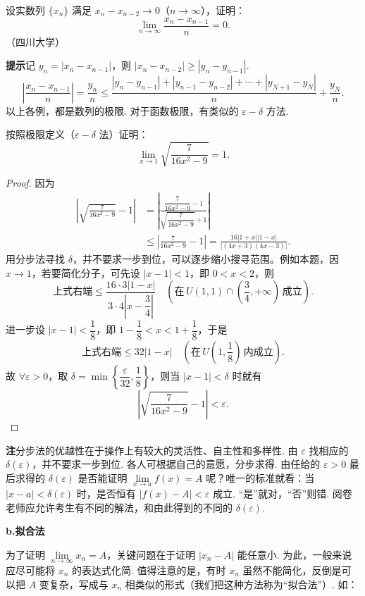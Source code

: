 \documentclass[UTF8,12pt,a4paper,fontset=fandol]{ctexart}
\begin{document}
设实数列 $\{x_n\}$ 满足 $x_n-x_{n-2}\to0$（$n\to\infty$），证明：
\[
  \lim_{n\to\infty}\frac{x_n-x_{n-1}}n=0.
\]
（四川大学）

\noindent\textbf{提示}\quad 记 $y_n=|x_n-x_{n-1}|$，则 $|x_n-x_{n-2}|\ge |y_n-y_{n-1}|$.
\[
  \left|\frac{x_n-x_{n-1}}n\right|
  =\frac{y_n}n
  \le \frac{|y_n-y_{n-1}|+|y_{n-1}-y_{n-2}|+\cdots+|y_{N+1}-y_N|}{n}
  +\frac{y_N}{n}.
\]
以上各例，都是数列的极限. 对于函数极限，有类似的 $\varepsilon-\delta$ 方法.


\begin{example}
按照极限定义（$\varepsilon-\delta$ 法）证明：
\[
  \lim_{x\to1}\sqrt{\frac7{16x^2-9}}=1.
\]

\begin{proof}
因为
\begin{align*}
\left|\sqrt{\frac7{16x^2-9}}-1\right|
&=\left|\frac{\dfrac7{16x^2-9}-1}{\sqrt{\dfrac7{16x^2-9}}+1}\right|\\
&\leqslant \left|\frac7{16x^2-9}-1\right|
=\frac{16|1+x||1-x|}{|(4x+3)(4x-3)|}.
\end{align*}
用分步法寻找 $\delta$，并不要求一步到位，可以逐步缩小搜寻范围。例如本题，因 $x\to1$，若要简化分子，可先设 $|x-1|<1$，即 $0<x<2$，则
\[
  \text{上式右端}\leqslant
  \frac{16\cdot3|1-x|}{3\cdot4\left|x-\dfrac34\right|}
  \quad\left(\text{在}\,U(1,1)\cap\left(\frac34,+\infty\right)\,\text{成立}\right).
\]
进一步设 $|x-1|<\dfrac18$，即 $1-\dfrac18<x<1+\dfrac18$，于是
\[
  \text{上式右端}\leqslant 32|1-x|\quad\left(\text{在}\,U\left(1,\frac18\right)\,\text{内成立}\right).
\]
故 $\forall\varepsilon>0$，取 $\delta=\min\left\{\dfrac\varepsilon{32},\dfrac18\right\}$，则当 $|x-1|<\delta$ 时就有
\[
  \left|\sqrt{\frac7{16x^2-9}}-1\right|<\varepsilon.
\]
\end{proof}
\end{example}


\noindent\textbf{注}\quad 分步法的优越性在于操作上有较大的灵活性、自主性和多样性. 由 $\varepsilon$ 找相应的 $\delta(\varepsilon)$，并不要求一步到位. 各人可根据自己的意愿，分步求得. 由任给的 $\varepsilon>0$ 最后求得的 $\delta(\varepsilon)$ 是否能证明 $\lim\limits_{x\to a}f(x)=A$ 呢？唯一的标准就看：当 $|x-a|<\delta(\varepsilon)$ 时，是否恒有 $|f(x)-A|<\varepsilon$ 成立. “是”就对，“否”则错. 阅卷老师应允许考生有不同的解法，和由此得到的不同的 $\delta(\varepsilon)$.

\noindent\textbf{b.\quad 拟合法}

为了证明 $\lim\limits_{n\to\infty}x_n=A$，关键问题在于证明 $|x_n-A|$ 能任意小. 为此，一般来说应尽可能将 $x_n$ 的表达式化简. 值得注意的是，有时 $x_n$ 虽然不能简化，反倒是可以把 $A$ 变复杂，写成与 $x_n$ 相类似的形式（我们把这种方法称为“拟合法”）. 如：
\end{document}
